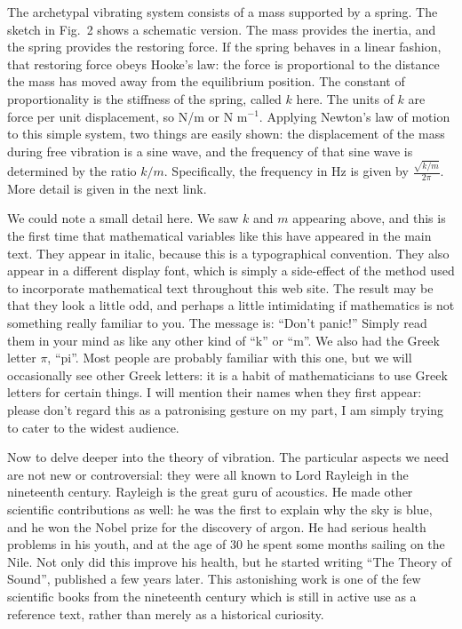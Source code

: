   The archetypal vibrating system consists of a mass supported by a spring. The 
  sketch in Fig.\ 2 shows a schematic version. The mass provides the inertia, 
  and the spring provides the restoring force. If the spring behaves in a 
  linear fashion, that restoring force obeys Hooke's law: the force is 
  proportional to the distance the mass has moved away from the equilibrium 
  position. The constant of proportionality is the stiffness of the spring, 
  called $k$ here. The units of $k$ are force per unit displacement, so N/m or 
  N m$^{-1}$. Applying Newton's law of motion to this simple system, two things 
  are easily shown: the displacement of the mass during free vibration is a 
  sine wave, and the frequency of that sine wave is determined by the ratio 
  $k/m$. Specifically, the frequency in Hz is given by $\frac{\sqrt{k/m}}{2 
  \pi}$. More detail is given in the next link. 


  We could note a small detail here. We saw $k$ and $m$ appearing above, and 
  this is the first time that mathematical variables like this have appeared in 
  the main text. They appear in italic, because this is a typographical 
  convention. They also appear in a different display font, which is simply a 
  side-effect of the method used to incorporate mathematical text throughout 
  this web site. The result may be that they look a little odd, and perhaps a 
  little intimidating if mathematics is not something really familiar to you. 
  The message is: ``Don't panic!'' Simply read them in your mind as like any 
  other kind of ``k'' or ``m''. We also had the Greek letter $\pi$, ``pi''. 
  Most people are probably familiar with this one, but we will occasionally see 
  other Greek letters: it is a habit of mathematicians to use Greek letters for 
  certain things. I will mention their names when they first appear: please 
  don't regard this as a patronising gesture on my part, I am simply trying to 
  cater to the widest audience. 

  Now to delve deeper into the theory of vibration. The particular aspects we 
  need are not new or controversial: they were all known to Lord Rayleigh in 
  the nineteenth century. Rayleigh is the great guru of acoustics. He made 
  other scientific contributions as well: he was the first to explain why the 
  sky is blue, and he won the Nobel prize for the discovery of argon. He had 
  serious health problems in his youth, and at the age of 30 he spent some 
  months sailing on the Nile. Not only did this improve his health, but he 
  started writing ``The Theory of Sound'', published a few years later. This 
  astonishing work is one of the few scientific books from the nineteenth 
  century which is still in active use as a reference text, rather than merely 
  as a historical curiosity. 

